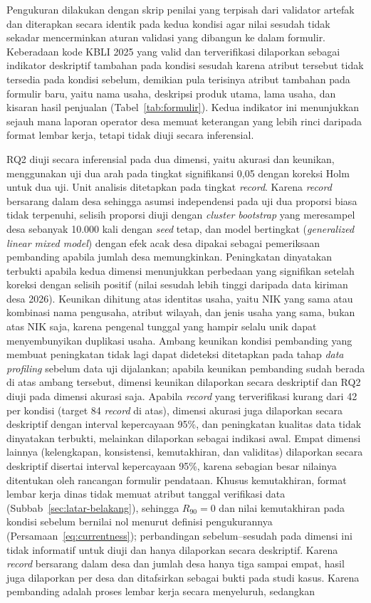 Pengukuran dilakukan dengan skrip penilai yang terpisah dari validator artefak dan diterapkan secara identik pada kedua kondisi agar nilai sesudah tidak sekadar mencerminkan aturan validasi yang dibangun ke dalam formulir. Keberadaan kode KBLI 2025 yang valid dan terverifikasi dilaporkan sebagai indikator deskriptif tambahan pada kondisi sesudah karena atribut tersebut tidak tersedia pada kondisi sebelum, demikian pula terisinya atribut tambahan pada formulir baru, yaitu nama usaha, deskripsi produk utama, lama usaha, dan kisaran hasil penjualan (Tabel~\ref{tab:formulir}). Kedua indikator ini menunjukkan sejauh mana laporan operator desa memuat keterangan yang lebih rinci daripada format lembar kerja, tetapi tidak diuji secara inferensial.

RQ2 diuji secara inferensial pada dua dimensi, yaitu akurasi dan keunikan, menggunakan uji dua arah pada tingkat signifikansi 0,05 dengan koreksi Holm untuk dua uji. Unit analisis ditetapkan pada tingkat \textit{record}. Karena \textit{record} bersarang dalam desa sehingga asumsi independensi pada uji dua proporsi biasa tidak terpenuhi, selisih proporsi diuji dengan \textit{cluster bootstrap} yang meresampel desa sebanyak 10.000 kali dengan \textit{seed} tetap, dan model bertingkat (\textit{generalized linear mixed model}) dengan efek acak desa dipakai sebagai pemeriksaan pembanding apabila jumlah desa memungkinkan. Peningkatan dinyatakan terbukti apabila kedua dimensi menunjukkan perbedaan yang signifikan setelah koreksi dengan selisih positif (nilai sesudah lebih tinggi daripada data kiriman desa 2026). Keunikan dihitung atas identitas usaha, yaitu NIK yang sama atau kombinasi nama pengusaha, atribut wilayah, dan jenis usaha yang sama, bukan atas NIK saja, karena pengenal tunggal yang hampir selalu unik dapat menyembunyikan duplikasi usaha. Ambang keunikan kondisi pembanding yang membuat peningkatan tidak lagi dapat dideteksi ditetapkan pada tahap \textit{data profiling} sebelum data uji dijalankan; apabila keunikan pembanding sudah berada di atas ambang tersebut, dimensi keunikan dilaporkan secara deskriptif dan RQ2 diuji pada dimensi akurasi saja. Apabila \textit{record} yang terverifikasi kurang dari 42 per kondisi (target 84 \textit{record} di atas), dimensi akurasi juga dilaporkan secara deskriptif dengan interval kepercayaan 95\%, dan peningkatan kualitas data tidak dinyatakan terbukti, melainkan dilaporkan sebagai indikasi awal. Empat dimensi lainnya (kelengkapan, konsistensi, kemutakhiran, dan validitas) dilaporkan secara deskriptif disertai interval kepercayaan 95\%, karena sebagian besar nilainya ditentukan oleh rancangan formulir pendataan. Khusus kemutakhiran, format lembar kerja dinas tidak memuat atribut tanggal verifikasi data (Subbab~\ref{sec:latar-belakang}), sehingga $R_{90} = 0$ dan nilai kemutakhiran pada kondisi sebelum bernilai nol menurut definisi pengukurannya (Persamaan~\eqref{eq:currentness}); perbandingan sebelum--sesudah pada dimensi ini tidak informatif untuk diuji dan hanya dilaporkan secara deskriptif. Karena \textit{record} bersarang dalam desa dan jumlah desa hanya tiga sampai empat, hasil juga dilaporkan per desa dan ditafsirkan sebagai bukti pada studi kasus. Karena pembanding adalah proses lembar kerja secara menyeluruh, sedangkan 